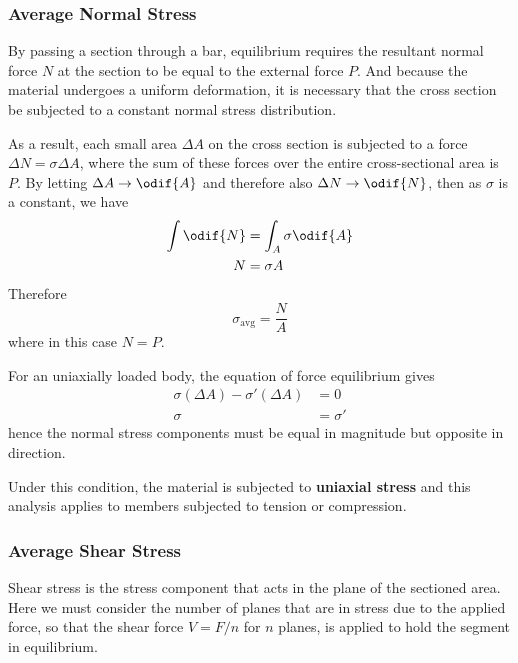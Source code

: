 \documentclass{article}
\begin{document}
\subsubsection{Average Normal Stress}
By passing a section through a bar, equilibrium requires the resultant normal force \(N\) at the section to be
equal to the external force \(P\). And because the material undergoes a uniform deformation, it is necessary
that the cross section be subjected to a constant normal stress distribution.

As a result, each small area \(\Delta A\) on the cross section is subjected
to a force \(\Delta N = \sigma \Delta A\), where the sum of these forces over the entire cross-sectional area
is \(P\). By letting \(\Delta A \to \odif{A} \) and therefore also \( \Delta N \to \odif{N} \), then as \(\sigma\)
is a constant, we have
\begin{align*}
    \int \odif{N} & = \int_A \sigma \odif{A} \\
    N             & = \sigma A
\end{align*}
Therefore
\begin{equation*}
    \sigma_{\mathrm{avg}} = \frac{N}{A}
\end{equation*}
where in this case \(N = P\).
\begin{theorem}[Equilibrium]
    For an uniaxially loaded body, the equation of force equilibrium gives
    \begin{align*}
        \sigma \left( \Delta A \right) - \sigma' \left( \Delta A \right) & = 0       \\
        \sigma                                                           & = \sigma'
    \end{align*}
    hence the normal stress components must be equal in magnitude but opposite in direction.

    Under this condition, the material is subjected to \textbf{uniaxial stress} and this analysis
    applies to members subjected to tension or compression.
\end{theorem}
\subsubsection{Average Shear Stress}
Shear stress is the stress component that acts in the plane of the sectioned area.
Here we must consider the number of planes that are in stress due to the applied force,
so that the shear force \(V = F / n\) for \(n\) planes, is applied to hold the segment in
equilibrium.
\end{document}

